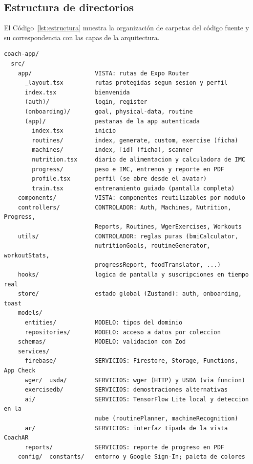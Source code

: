 \subsection{Estructura de directorios}

El Código~\ref{lst:estructura} muestra la organización de carpetas del
código fuente y su correspondencia con las capas de la arquitectura.

\begin{lstlisting}[language={}, numbers=none, caption={Estructura de carpetas del código fuente}, label={lst:estructura}]
coach-app/
  src/
    app/                  VISTA: rutas de Expo Router
      _layout.tsx         rutas protegidas segun sesion y perfil
      index.tsx           bienvenida
      (auth)/             login, register
      (onboarding)/       goal, physical-data, routine
      (app)/              pestanas de la app autenticada
        index.tsx         inicio
        routines/         index, generate, custom, exercise (ficha)
        machines/         index, [id] (ficha), scanner
        nutrition.tsx     diario de alimentacion y calculadora de IMC
        progress/         peso e IMC, entrenos y reporte en PDF
        profile.tsx       perfil (se abre desde el avatar)
        train.tsx         entrenamiento guiado (pantalla completa)
    components/           VISTA: componentes reutilizables por modulo
    controllers/          CONTROLADOR: Auth, Machines, Nutrition, Progress,
                          Reports, Routines, WgerExercises, Workouts
    utils/                CONTROLADOR: reglas puras (bmiCalculator,
                          nutritionGoals, routineGenerator, workoutStats,
                          progressReport, foodTranslator, ...)
    hooks/                logica de pantalla y suscripciones en tiempo real
    store/                estado global (Zustand): auth, onboarding, toast
    models/
      entities/           MODELO: tipos del dominio
      repositories/       MODELO: acceso a datos por coleccion
    schemas/              MODELO: validacion con Zod
    services/
      firebase/           SERVICIOS: Firestore, Storage, Functions, App Check
      wger/  usda/        SERVICIOS: wger (HTTP) y USDA (via funcion)
      exercisedb/         SERVICIOS: demostraciones alternativas
      ai/                 SERVICIOS: TensorFlow Lite local y deteccion en la
                          nube (routinePlanner, machineRecognition)
      ar/                 SERVICIOS: interfaz tipada de la vista CoachAR
      reports/            SERVICIOS: reporte de progreso en PDF
    config/  constants/   entorno y Google Sign-In; paleta de colores

\end{lstlisting}

